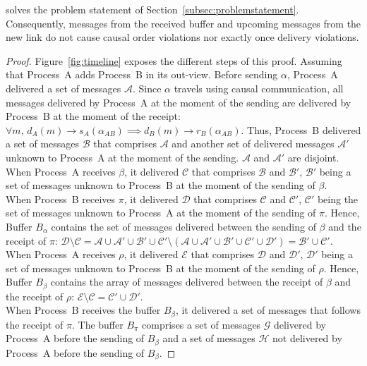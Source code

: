 \RPCBROADCAST solves the problem statement of
Section~\ref{subsec:problemstatement}. Consequently, messages from the received
buffer and upcoming messages from the new link do not cause causal order
violations nor exactly once delivery violations.

\begin{proof}
  Figure~\ref{fig:timeline} exposes the different steps of this proof. Assuming
  that Process~A adds Process~B in its out-view. Before sending $\alpha$,
  Process~A delivered a set of messages $\mathcal{A}$. Since $\alpha$ travels
  using causal communication, all messages delivered by Process~A at the moment
  of the sending are delivered by Process~B at the moment of the receipt:
  $\forall m,\, d_A(m) \rightarrow s_A(\alpha_{AB}) \implies d_B(m) \rightarrow
  r_B(\alpha_{AB})$.
  Thus, Process~B delivered a set of messages $\mathcal{B}$ that comprises
  $\mathcal{A}$ and another set of delivered messages $\mathcal{A}'$ unknown to
  Process~A at the moment of the sending. $\mathcal{A}$ and $\mathcal{A}'$ are
  disjoint.\\
  When Process~A receives $\beta$, it delivered $\mathcal{C}$ that comprises
  $\mathcal{B}$ and $\mathcal{B}'$, $\mathcal{B}'$ being a set of messages
  unknown to Process~B at the moment of the sending of $\beta$. \\
  When Process~B receives $\pi$, it delivered $\mathcal{D}$ that comprises
  $\mathcal{C}$ and $\mathcal{C}'$, $\mathcal{C}'$ being the set of messages
  unknown to Process~A at the moment of the sending of $\pi$. Hence, Buffer
  $B_\alpha$ contains the set of messages delivered between the sending of
  $\beta$ and the receipt of $\pi$:
  $\mathcal{D} \setminus \mathcal{C} = \mathcal{A} \cup \mathcal{A}' \cup
  \mathcal{B}' \cup \mathcal{C}' \setminus (\mathcal{A} \cup \mathcal{A'} \cup
  \mathcal{B}' \cup \mathcal{C'} \cup \mathcal{D}') = \mathcal{B}' \cup
  \mathcal{C}'$. \\
  When Process~A receives $\rho$, it delivered $\mathcal{E}$ that comprises
  $\mathcal{D}$ and $\mathcal{D}'$, $\mathcal{D}'$ being a set of messages
  unknown to Process~B at the moment of the sending of $\rho$. Hence, Buffer
  $B_\beta$ contains the array of messages delivered between the receipt of
  $\beta$ and the receipt of $\rho$:
  $\mathcal{E} \setminus \mathcal{C} = \mathcal{C}' \cup \mathcal{D}'$.\\
  When Process~B receives the buffer $B_\beta$, it delivered a set of messages
  that follows the receipt of $\pi$. The buffer $B_\pi$ comprises a set of
  messages $\mathcal{G}$ delivered by Process~A before the sending of $B_\beta$
  and a set of messages $\mathcal{H}$ not delivered by Process~A before the
  sending of $B_\beta$. 
  

\end{proof}
